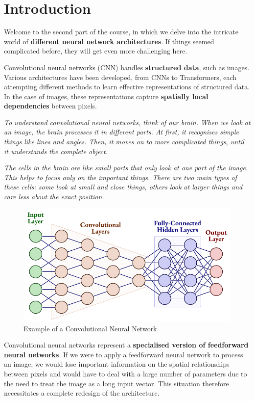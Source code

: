 \section{Introduction}
Welcome to the second part of the course, in which we delve into the intricate world of \textbf{different neural network architectures}. If things seemed complicated before, they will get even more challenging here. \faSadTear[regular]

Convolutional neural networks (CNN) handles \textbf{structured data}, such as images. Various architectures have been developed, from CNNs to Transformers, each attempting different methods to learn effective representations of structured data. In the case of images, these representations capture \textbf{spatially local dependencies} between pixels.

\textit{To understand convolutional neural networks, think of our brain. When we look at an image, the brain processes it in different parts. At first, it recognises simple things like lines and angles. Then, it moves on to more complicated things, until it understands the complete object.}

\textit{The cells in the brain are like small parts that only look at one part of the image. This helps to focus only on the important things. There are two main types of these cells: some look at small and close things, others look at larger things and care less about the exact position.}

\begin{figure}[!htbp]
    \centering
    \includegraphics[width=\textwidth]{tikz/chapter5 - CNN.pdf}
    \caption{Example of a Convolutional Neural Network}
\end{figure}

Convolutional neural networks represent a \textbf{specialised version of feedforward neural networks}. If we were to apply a feedforward neural network to process an image, we would lose important information on the spatial relationships between pixels and would have to deal with a large number of parameters due to the need to treat the image as a long input vector. This situation therefore necessitates a complete redesign of the architecture.

